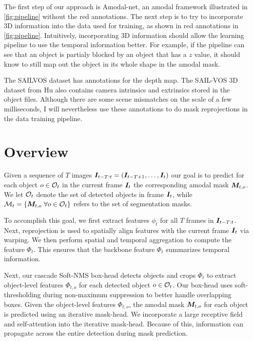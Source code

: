 The first step of our approach is Amodal-net, an amodal framework illustrated in \ref{fig:pipeline} without the red annotations. The next step is to try to incorporate 3D information into the data used for training, as shown in red annotations in \ref{fig:pipeline}. Intuitively,  incorporating 3D information should allow the learning pipeline to use the temporal information better. For example, if the pipeline can see that an object is partialy blocked by an object that has a $z$ value, it should know to still map out the object in its whole shape in the amodal mask. 

The SAILVOS dataset\cite{hu2019sail} has annotations for the depth map. The SAIL-VOS 3D dataset from Hu \etal \cite{HuCVPR2021} also contains camera intrinsics and extrinsics stored in the object files. Although there are some scene mismatches on the scale of a few milliseconds, I will nevertheless use these annotations to do mask reprojections in the data training pipeline.

\section{Overview}
Given a sequence of $T$ images ${\bm{I}}_{t-T:t}=({\bm{I}}_{t-T+1}, \hdots, {\bm{I}}_{t})$ our goal is to predict for each object $o\in{\mathcal{O}}_t$ in the current frame ${\bm{I}}_t$ the corresponding amodal mask ${\bm{M}}_{t,o}$. 
We let ${\mathcal{O}}_t$ denote the set of detected objects in frame ${\bm{I}}_t$, while ${\mathcal{M}}_t = \{{\bm{M}}_{t,o}~\forall o \in {\mathcal{O}}_t\}$ refers to the set of segmentation masks.

To accomplish this goal, we first extract features $\phi_t$ for all $T$ frames in ${\bm{I}}_{t-T:t}$. %
Next, reprojection is used to spatially align features with the current frame ${\bm{I}}_t$ via warping. We then perform spatial and temporal aggregation to compute the feature $\Phi_t$. This ensures that the backbone feature $\Phi_t$ summarizes temporal information. 

Next, our cascade Soft-NMS box-head detects objects and crops $\Phi_t$ to extract object-level features $\Phi_{t,o}$ for each detected object $o\in{\mathcal{O}}_t$. Our box-head uses soft-thresholding during non-maximum suppression to better handle overlapping boxes. Given the object-level features $\Phi_{t,o}$, the amodal mask ${\bm{M}}_{t,o}$ for each object is predicted using an iterative mask-head. We incorporate a large receptive field and self-attention into the iterative mask-head. %
Because of this, information can propagate across the entire detection during mask prediction.

